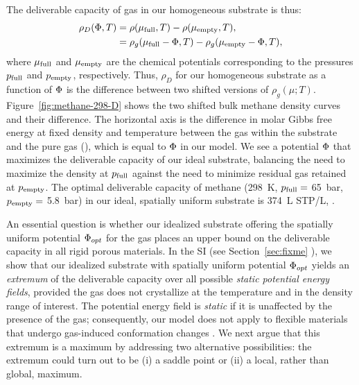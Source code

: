 The deliverable capacity of gas in our homogeneous substrate is thus:
\begin{align}
    \rho_D(\Phi,T) &= \rho(\mu_{\text{full}},T) - \rho(\mu_{\text{empty}},T),
    \label{eq:DofPhi}
    \\
    &= \rho_g(\mu_{\text{full}}-\Phi,T) - \rho_g(\mu_{\text{empty}}-\Phi,T),
\end{align}
where $\mu_{\text{full}}$ and $\mu_{\text{empty}}$ are the chemical potentials corresponding to the pressures $p_{\text{full}}$ and $p_{\text{empty}}$, respectively.
Thus, $\rho_D$ for our homogeneous substrate as a function of $\Phi$ is the difference between two shifted versions of $\rho_g(\mu; T)$.
Figure~\ref{fig:methane-298-D} shows the two shifted bulk methane density curves and their difference.
The horizontal axis
is the difference in molar Gibbs free energy at fixed density and temperature between the gas within the substrate and the pure gas (\gst), which is equal to $\Phi$ in our model.
We see a potential $\Phi$ that maximizes the deliverable capacity of our ideal substrate, balancing the need to maximize the density at $p_{\text{full}}$ against the need to minimize residual gas retained at $p_{\text{empty}}$. 
The optimal deliverable capacity of methane (298\ K, $p_{\text{full}}=$ 65\ bar, $p_{\text{empty}}=$ 5.8\ bar) in our ideal, spatially uniform substrate is 374\ L STP/L, .
%

An essential question is whether our idealized substrate offering the spatially uniform potential $\Phi_{opt}$ for the gas places an upper bound on the deliverable capacity in all rigid porous materials. 
In the SI (see Section~\ref{sec:fixme} ), we show that our idealized substrate with spatially uniform potential $\Phi_{opt}$ yields an \emph{extremum} of the deliverable capacity over all possible \emph{static potential energy fields}, provided the gas does not crystallize at the temperature and in the density range of interest. The potential energy field is \emph{static} if it is unaffected by the presence of the gas; consequently, our model does not apply to flexible materials that undergo gas-induced conformation changes \cite{schneemann2014flexible}. We next argue that this extremum is a maximum by addressing two alternative possibilities: the extremum could turn out to be (i) a saddle point or (ii) a local, rather than global, maximum.

